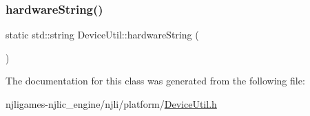 \mbox{\label{class_device_util_a169613511f0399d3e0d1b3d8674808ba}} 
\subsubsection{\texorpdfstring{hardware\+String()}{hardwareString()}}
{\footnotesize\ttfamily static std\+::string Device\+Util\+::hardware\+String (\begin{DoxyParamCaption}{ }\end{DoxyParamCaption})\hspace{0.3cm}{\ttfamily [static]}}



The documentation for this class was generated from the following file\+:\begin{DoxyCompactItemize}
\item 
njligames-\/njlic\+\_\+engine/njli/platform/\mbox{\hyperlink{_device_util_8h}{Device\+Util.\+h}}\end{DoxyCompactItemize}
